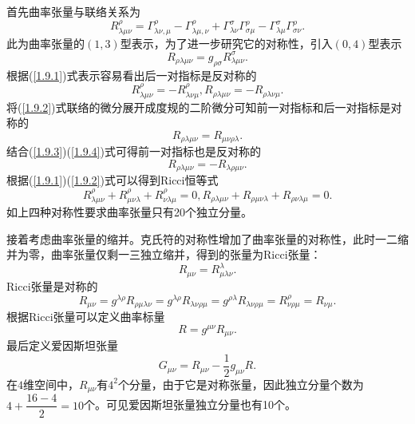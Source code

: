 \documentclass[11pt, a4paper, oneside, onecolumn]{ctexart}
\numberwithin{equation}{subsection}
\begin{document}
首先曲率张量与联络关系为
\begin{equation}
R_{\lambda\mu\nu}^{\rho}=\Gamma_{\lambda\nu,\mu}^{\rho}-\Gamma_{\lambda\mu,\nu}^{\rho}+\Gamma_{\lambda\nu}^{\sigma}\Gamma_{\sigma\mu}^{\rho}-\Gamma_{\lambda\mu}^{\sigma}\Gamma_{\sigma\nu}^{\rho}.\label{1.9.1}
\end{equation}
此为曲率张量的$(1,3)$型表示，为了进一步研究它的对称性，引入$\left(0,4\right)$型表示
\begin{equation}
R_{\rho\lambda\mu\nu}=g_{\rho\sigma}R^{\sigma}_{\lambda\mu\nu}.\label{1.9.2}
\end{equation}
根据(\ref{1.9.1})式表示容易看出后一对指标是反对称的
\begin{equation}
R_{\lambda\mu\nu}^{\rho}=-R_{\lambda\nu\mu}^{\rho},R_{\rho\lambda\mu\nu}=-R_{\rho\lambda\nu\mu}.\label{1.9.3}
\end{equation}
将(\ref{1.9.2})式联络的微分展开成度规的二阶微分可知前一对指标和后一对指标是对称的
\begin{equation}
R_{\rho\lambda\mu\nu}=R_{\mu\nu\rho\lambda}.\label{1.9.4}
\end{equation}
结合(\ref{1.9.3})(\ref{1.9.4})式可得前一对指标也是反对称的
\begin{equation}
R_{\rho\lambda\mu\nu}=-R_{\lambda\rho\mu\nu}.
\end{equation}
根据(\ref{1.9.1})(\ref{1.9.2})式可以得到Ricci恒等式
\begin{equation}
R_{\lambda\mu\nu}^{\rho}+R_{\mu\nu\lambda}^{\rho}+R_{\nu\lambda\mu}^{\rho}=0,R_{\rho\lambda\mu\nu}+R_{\rho\mu\nu\lambda}+R_{\rho\nu\lambda\mu}=0.
\end{equation}
如上四种对称性要求曲率张量只有20个独立分量。

接着考虑曲率张量的缩并。克氏符的对称性增加了曲率张量的对称性，此时一二缩并为零，曲率张量仅剩一三独立缩并，得到的张量为Ricci张量：
\begin{equation}
R_{\mu\nu}=R^{\lambda}_{\mu\lambda\nu}.
\end{equation}
Ricci张量是对称的
\begin{equation}
R_{\mu\nu}=g^{\lambda\rho}R_{\rho\mu\lambda\nu}=g^{\lambda\rho}R_{\lambda\nu\rho\mu}=g^{\rho\lambda}R_{\lambda\nu\rho\mu}=R^{\rho}_{\nu\rho\mu}=R_{\nu\mu}.
\end{equation}
根据Ricci张量可以定义曲率标量
\begin{equation}
R=g^{\mu\nu}R_{\mu\nu}.
\end{equation}
最后定义爱因斯坦张量
\begin{equation}
G_{\mu\nu}=R_{\mu\nu}-\frac12g_{\mu\nu}R.
\end{equation}
在$4$维空间中，$R_{\mu\nu}$有$4^{2}$个分量，由于它是对称张量，因此独立分量个数为$4+\dfrac{16-4}{2}=10$个。可见爱因斯坦张量独立分量也有10个。
\end{document}
